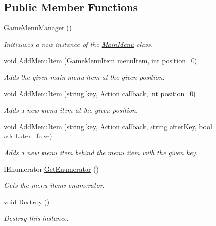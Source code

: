 \subsection*{Public Member Functions}
\begin{DoxyCompactItemize}
\item 
\hyperlink{class_game_menu_manager_a7cab6d4a32b636bf93a835f9be82b00a}{Game\+Menu\+Manager} ()
\begin{DoxyCompactList}\small\item\em Initializes a new instance of the \hyperlink{class_main_menu}{Main\+Menu} class. \end{DoxyCompactList}\item 
void \hyperlink{class_game_menu_manager_a9619c435e22a9149b2ac6baa672ed018}{Add\+Menu\+Item} (\hyperlink{class_game_menu_item}{Game\+Menu\+Item} menu\+Item, int position=0)
\begin{DoxyCompactList}\small\item\em Adds the given main menu item at the given position. \end{DoxyCompactList}\item 
void \hyperlink{class_game_menu_manager_a0ce66a98816e59b4385d48b1dabb3cb4}{Add\+Menu\+Item} (string key, Action callback, int position=0)
\begin{DoxyCompactList}\small\item\em Adds a new menu item at the given position. \end{DoxyCompactList}\item 
void \hyperlink{class_game_menu_manager_a4f943a136b5f5925c197b6db73d8c60b}{Add\+Menu\+Item} (string key, Action callback, string after\+Key, bool add\+Later=false)
\begin{DoxyCompactList}\small\item\em Adds a new menu item behind the menu item with the given key. \end{DoxyCompactList}\item 
I\+Enumerator \hyperlink{class_game_menu_manager_ad13751caaa9d6728f8ac465ba27b06f9}{Get\+Enumerator} ()
\begin{DoxyCompactList}\small\item\em Gets the menu items enumerator. \end{DoxyCompactList}\item 
void \hyperlink{class_game_menu_manager_a005762272c62660d9c013e33ef671487}{Destroy} ()
\begin{DoxyCompactList}\small\item\em Destroy this instance. \end{DoxyCompactList}\end{DoxyCompactItemize}
